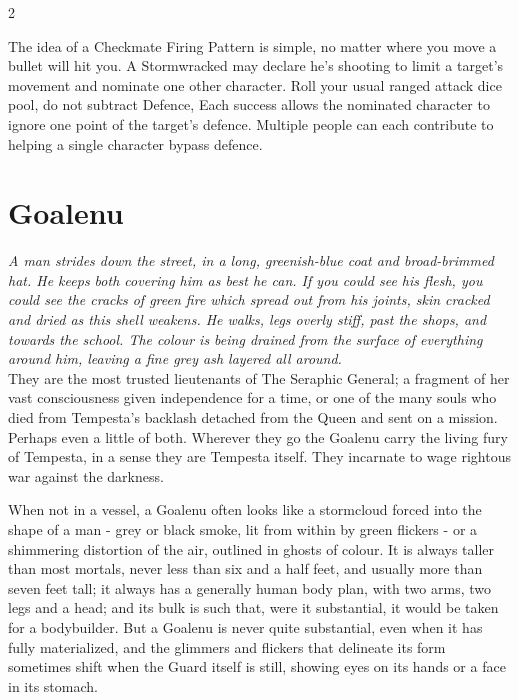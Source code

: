 \begin{multicols}{2}
\begin{mybox}
The idea of a Checkmate Firing Pattern is simple, no matter where you move a bullet will hit you. A Stormwracked may declare he's shooting to limit a target's movement and nominate one other character. Roll your usual ranged attack dice pool, do not subtract Defence, Each success allows the nominated character to ignore one point of the target's defence. Multiple people can each contribute to helping a single character bypass defence. 

\end{mybox}


\section*{Goalenu}
\label{sec:Goalenu}

\textit{A man strides down the street, in a long, greenish-blue coat and broad-brimmed hat. He keeps both covering him as best he can. If you could see his flesh, you could see the cracks of green fire which spread out from his joints, skin cracked and dried as this shell weakens. He walks, legs overly stiff, past the shops, and towards the school. The colour is being drained from the surface of everything around him, leaving a fine grey ash layered all around.}\\

\noindent They are the most trusted lieutenants of The Seraphic General; a fragment of her vast consciousness given independence for a time, or one of the many souls who died from Tempesta's backlash detached from the Queen and sent on a mission. Perhaps even a little of both. Wherever they go the Goalenu carry the living fury of Tempesta, in a sense they are Tempesta itself. They incarnate to wage rightous war against the darkness.

When not in a vessel, a Goalenu often looks like a stormcloud forced into the shape of a man - grey or black smoke, lit from within by green flickers - or a shimmering distortion of the air, outlined in ghosts of colour. It is always taller than most mortals, never less than six and a half feet, and usually more than seven feet tall; it always has a generally human body plan, with two arms, two legs and a head; and its bulk is such that, were it substantial, it would be taken for a bodybuilder. But a Goalenu is never quite substantial, even when it has fully materialized, and the glimmers and flickers that delineate its form sometimes shift when the Guard itself is still, showing eyes on its hands or a face in its stomach.


\end{multicols}
